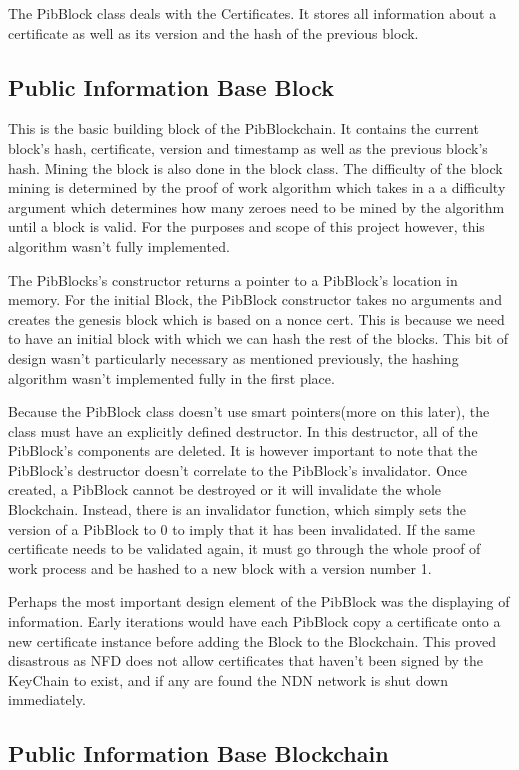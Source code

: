 The PibBlock class deals with the Certificates. It stores all information about a certificate as well as its version and the hash of the previous block.
\subsection{Public Information Base Block}
This is the basic building block of the PibBlockchain. It contains the current block's hash, certificate, version and timestamp as well as the previous block's hash. Mining the block is also done in the block class. The difficulty of the block mining is determined by the proof of work algorithm which takes in a a difficulty argument which determines how many zeroes need to be mined by the algorithm until a block is valid. For the purposes and scope of this project however, this algorithm wasn't fully implemented. 

The PibBlocks's constructor returns a pointer to a PibBlock's location in memory. For the initial Block, the PibBlock constructor takes no arguments and creates the genesis block which is based on a nonce cert. This is because we need to have an initial block with which we can hash the rest of the blocks. This bit of design wasn't particularly necessary as mentioned previously, the hashing algorithm wasn't implemented fully in the first place. 

Because the PibBlock class doesn't use smart pointers(more on this later), the class must have an explicitly defined destructor. In this destructor, all of the PibBlock's components are deleted. It is however important to note that the PibBlock's destructor doesn't correlate to the PibBlock's invalidator. Once created, a PibBlock cannot be destroyed or it will invalidate the whole Blockchain. Instead, there is an invalidator function, which simply sets the version of a PibBlock to 0 to imply that it has been invalidated. If the same certificate needs to be validated again, it must go through the whole proof of work process and be hashed to a new block with a version number 1.

Perhaps the most important design element of the PibBlock was the displaying of information. Early iterations would have each PibBlock copy a certificate onto a new certificate instance before adding the Block to the Blockchain. This proved disastrous as NFD does not allow certificates that haven't been signed by the KeyChain to exist, and if any are found the NDN network is shut down immediately.
\subsection{Public Information Base Blockchain}

